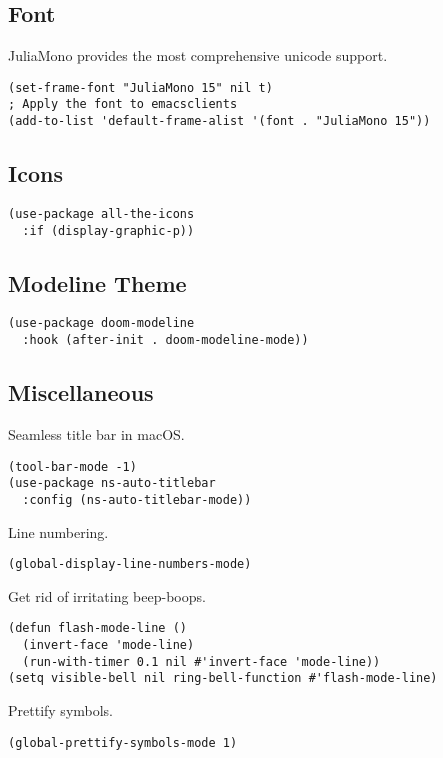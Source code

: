 \documentclass[11pt]{article}
\begin{document}
\subsection{Font}
\label{sec:orgf7566b0}
JuliaMono provides the most comprehensive unicode support.
\begin{verbatim}
(set-frame-font "JuliaMono 15" nil t)
; Apply the font to emacsclients
(add-to-list 'default-frame-alist '(font . "JuliaMono 15"))
\end{verbatim}

\subsection{Icons}
\label{sec:orgfa52978}
\begin{verbatim}
(use-package all-the-icons
  :if (display-graphic-p))
\end{verbatim}

\subsection{Modeline Theme}
\label{sec:org7f49009}
\begin{verbatim}
(use-package doom-modeline
  :hook (after-init . doom-modeline-mode))
\end{verbatim}

\subsection{Miscellaneous}
\label{sec:orgea59240}
Seamless title bar in macOS.
\begin{verbatim}
(tool-bar-mode -1)
(use-package ns-auto-titlebar
  :config (ns-auto-titlebar-mode))
\end{verbatim}

Line numbering.
\begin{verbatim}
(global-display-line-numbers-mode)
\end{verbatim}

Get rid of irritating beep-boops.
\begin{verbatim}
(defun flash-mode-line ()
  (invert-face 'mode-line)
  (run-with-timer 0.1 nil #'invert-face 'mode-line))
(setq visible-bell nil ring-bell-function #'flash-mode-line)
\end{verbatim}

Prettify symbols.
\begin{verbatim}
(global-prettify-symbols-mode 1)
\end{verbatim}
\end{document}
